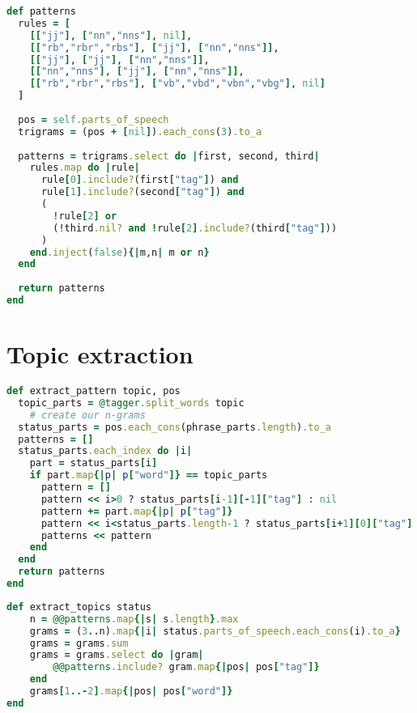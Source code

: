 \begin{lstlisting}[language=Ruby, caption={\emph{Status} object method for extracting patterns}, label=polarity:patterns]
def patterns
  rules = [
    [["jj"], ["nn","nns"], nil],
    [["rb","rbr","rbs"], ["jj"], ["nn","nns"]],
    [["jj"], ["jj"], ["nn","nns"]],
    [["nn","nns"], ["jj"], ["nn","nns"]],
    [["rb","rbr","rbs"], ["vb","vbd","vbn","vbg"], nil]
  ]
  
  pos = self.parts_of_speech
  trigrams = (pos + [nil]).each_cons(3).to_a    
  
  patterns = trigrams.select do |first, second, third|
    rules.map do |rule|
      rule[0].include?(first["tag"]) and 
      rule[1].include?(second["tag"]) and 
      (
        !rule[2] or 
        (!third.nil? and !rule[2].include?(third["tag"]))
      )
    end.inject(false){|m,n| m or n}
  end
  
  return patterns
end
\end{lstlisting}

\section{Topic extraction}


\begin{lstlisting}[language=Ruby, caption={\emph{TopicExtraction} method for extracting a topic's pattern from a status' part of speech tags}, label=topic:pattern_extract]
def extract_pattern topic, pos
  topic_parts = @tagger.split_words topic
	# create our n-grams
  status_parts = pos.each_cons(phrase_parts.length).to_a
  patterns = []
  status_parts.each_index do |i| 
    part = status_parts[i]
    if part.map{|p| p["word"]} == topic_parts
      pattern = []
      pattern << i>0 ? status_parts[i-1][-1]["tag"] : nil
      pattern += part.map{|p| p["tag"]}
      pattern << i<status_parts.length-1 ? status_parts[i+1][0]["tag"] : nil
      patterns << pattern
    end
  end
  return patterns
end
\end{lstlisting}

\begin{lstlisting}[language=Ruby, caption={\emph{TopicExtraction} method for extracting a status' topic}, label=topic:topic_extract]
def extract_topics status
	n = @@patterns.map{|s| s.length}.max
	grams = (3..n).map{|i| status.parts_of_speech.each_cons(i).to_a}
	grams = grams.sum
	grams = grams.select do |gram|
		@@patterns.include? gram.map{|pos| pos["tag"]}
	end
	grams[1..-2].map{|pos| pos["word"]}
end
\end{lstlisting}

% 